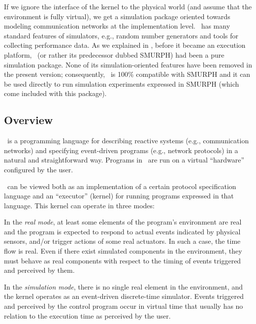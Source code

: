 If we ignore the interface of the {\smurph}
kernel to the physical world (and assume that the environment is fully virtual),
we get a simulation package oriented
towards modeling communication networks at the implementation level.
\smurph\ has many standard features of simulators, e.g.,
random number generators and tools for collecting performance data.
As we explained in , before it became an execution platform,
\smurph\ (or rather its predecessor dubbed {\sc SMURPH})
had been a pure simulation package.
None of its simulation-oriented features have been removed in the present
version; consequently, \smurph\ is 100\% compatible
with {\sc SMURPH} and it can be used directly to run simulation
experiments expressed in {\sc SMURPH} (which come included with this
package).

\subsection{Overview}
\label{rm_in_ov}

\smurph\ is a programming language for describing reactive systems
(e.g., communication networks) and specifying event-driven programs
(e.g., network protocols) in a natural and straightforward way.
Programs in \smurph\ are run on a virtual ``hardware'' configured by the user.

\smurph\ can be viewed both as
an implementation of a certain protocol specification language and an
``executor'' (kernel) for running programs expressed in that language.
This kernel can operate in three modes:

In the {\em real mode}, at least some elements of the program's
environment are real and the program is expected to respond to actual
events indicated by physical sensors, and/or trigger actions of some
real actuators.
In such a case, the time flow is real.
Even if there exist simulated components in the environment, they
must behave as real components with respect to the timing of
events triggered and perceived by them.

In the {\em simulation mode}, there is no single real element in the
environment, and the kernel operates as an event-driven
discrete-time simulator.
Events triggered and perceived by the control program occur in virtual time
that usually has no relation to the execution time as perceived by the user.

